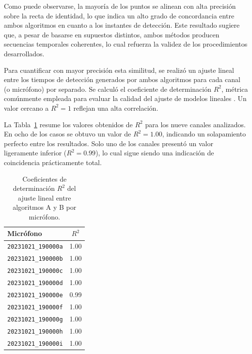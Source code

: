 Como puede observarse, la mayoría de los puntos se alinean con 
alta precisión sobre la recta de identidad, lo que indica un 
alto grado de concordancia entre ambos algoritmos en cuanto a 
los instantes de detección. Este resultado sugiere que, a pesar 
de basarse en supuestos distintos, ambos métodos producen 
secuencias temporales coherentes, lo cual refuerza la validez 
de los procedimientos desarrollados.

Para cuantificar con mayor precisión esta similitud, se realizó 
un ajuste lineal entre los tiempos de detección generados por 
ambos algoritmos para cada canal (o micrófono) por separado. Se 
calculó el coeficiente de determinación \( R^2 \), métrica 
comúnmente empleada para evaluar la calidad del ajuste de 
modelos lineales \cite{nagelkerke1991note}. Un valor cercano a 
\( R^2 = 1 \) reflejan una alta correlación.

La Tabla~\ref{tab:r2_results} resume los valores obtenidos de 
\( R^2 \) para los nueve canales analizados. En ocho de los 
casos se obtuvo un valor de \( R^2 = 1.00 \), indicando un 
solapamiento perfecto entre los resultados. Solo uno de los 
canales presentó un valor ligeramente inferior (\( R^2 = 0.99 \)), 
lo cual sigue siendo una indicación de coincidencia 
prácticamente total.

\begin{table}[ht]
    \centering
    \caption{Coeficientes de determinación \( R^2 \) del ajuste lineal entre algoritmos A y B por micrófono.}
    \label{tab:r2_results}
    \begin{tabular}{lc}
        \toprule
        \textbf{Micrófono} & \textbf{\( R^2 \)} \\
        \midrule
        \texttt{20231021\_190000a} & 1.00 \\
        \texttt{20231021\_190000b} & 1.00 \\
        \texttt{20231021\_190000c} & 1.00 \\
        \texttt{20231021\_190000d} & 1.00 \\
        \texttt{20231021\_190000e} & 0.99 \\
        \texttt{20231021\_190000f} & 1.00 \\
        \texttt{20231021\_190000g} & 1.00 \\
        \texttt{20231021\_190000h} & 1.00 \\
        \texttt{20231021\_190000i} & 1.00 \\
        \bottomrule
    \end{tabular}
\end{table}

